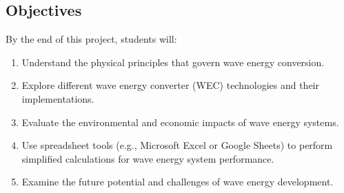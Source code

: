 \documentclass[letterpaper,10pt,english]{jupyterBook}
\begin{document}
\subsection{Objectives}
\label{\detokenize{ProjectInstructions:id46}}
\sphinxAtStartPar
By the end of this project, students will:
\begin{enumerate}
%
\item {} 
\sphinxAtStartPar
Understand the physical principles that govern wave energy conversion.

\item {} 
\sphinxAtStartPar
Explore different wave energy converter (WEC) technologies and their implementations.

\item {} 
\sphinxAtStartPar
Evaluate the environmental and economic impacts of wave energy systems.

\item {} 
\sphinxAtStartPar
Use spreadsheet tools (e.g., Microsoft Excel or Google Sheets) to perform simplified calculations for wave energy system performance.

\item {} 
\sphinxAtStartPar
Examine the future potential and challenges of wave energy development.

\end{enumerate}
\end{document}
